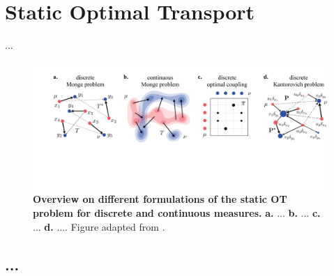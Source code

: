 \section{Static Optimal Transport}

...

\begin{figure}[t]
  \includegraphics[width=\textwidth]{figures/fig_ot_background.pdf}
  \caption{\textbf{Overview on different formulations of the static OT problem for discrete and continuous measures.} \textbf{a.} ... \textbf{b.} ... \textbf{c.} ... \textbf{d.} .... Figure adapted from \citet{peyre2019computational}.}	
  \label{fig:ot_principles}
\end{figure}

\subsection{...}

